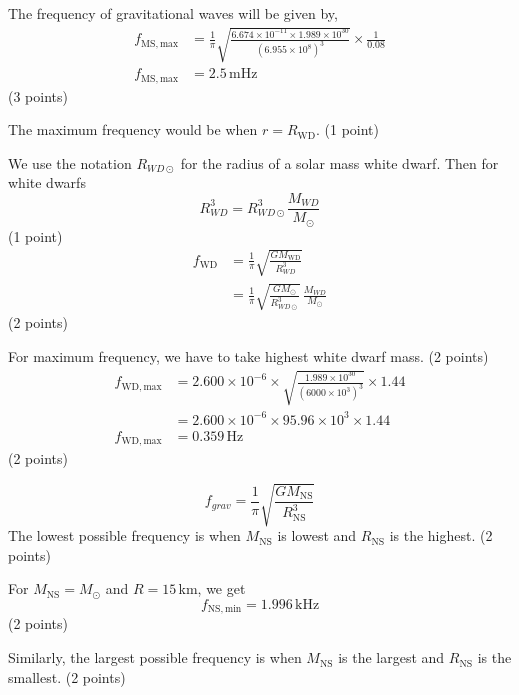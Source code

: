 \begin{description}
  The frequency of gravitational waves will be given by,
  \begin{align*}
    f_{\mathrm{MS,max}}
      &= \frac{1}{\pi}\sqrt{\frac{6.674 \times 10^{-11} \times 1.989 \times 10^{30}}
         {(6.955 \times 10^{8})^{3}}} \times \frac{1}{0.08} \\
    f_{\mathrm{MS,max}} &= 2.5\,\mathrm{mHz}
  \end{align*}
  \hfill(3 points)

\item[(T11.4)] The maximum frequency would be when $r = R_{\mathrm{WD}}$.
  \hfill(1 point)

  We use the notation $R_{WD\odot}$ for the radius of a solar mass white
  dwarf. Then for white dwarfs
  \[ R_{WD}^3 = R_{WD\odot}^3 \frac{M_{WD}}{M_\odot} \]
  \hfill(1 point)
  \begin{align*}
    f_{\mathrm{WD}}
      &= \frac{1}{\pi}\sqrt{\frac{G M_{\mathrm{WD}}}{R_{WD}^3}} \\
      &= \frac{1}{\pi}\sqrt{\frac{G M_\odot}{R_{WD\odot}^3}}\,
         \frac{M_{WD}}{M_\odot}
  \end{align*}
  \hfill(2 points)

  For maximum frequency, we have to take highest white dwarf mass.
  \hfill(2 points)
  \begin{align*}
    f_{\mathrm{WD,max}}
      &= 2.600 \times 10^{-6} \times
         \sqrt{\frac{1.989 \times 10^{30}}{(6000 \times 10^{3})^{3}}}
         \times 1.44 \\
      &= 2.600 \times 10^{-6} \times 95.96 \times 10^{3} \times 1.44 \\
    f_{\mathrm{WD,max}} &= 0.359\,\mathrm{Hz}
  \end{align*}
  \hfill(2 points)

\item[(T11.5)]
  \[ f_{grav} = \frac{1}{\pi}\sqrt{\frac{G M_{\mathrm{NS}}}{R_{\mathrm{NS}}^3}} \]
  The lowest possible frequency is when $M_{\mathrm{NS}}$ is lowest and
  $R_{\mathrm{NS}}$ is the highest. \hfill(2 points)

  For $M_{\mathrm{NS}} = M_\odot$ and $R = 15$\,km, we get
  \[ f_{\mathrm{NS,min}} = 1.996\,\mathrm{kHz} \]
  \hfill(2 points)

  Similarly, the largest possible frequency is when $M_{\mathrm{NS}}$ is the
  largest and $R_{\mathrm{NS}}$ is the smallest. \hfill(2 points)


\end{description}
